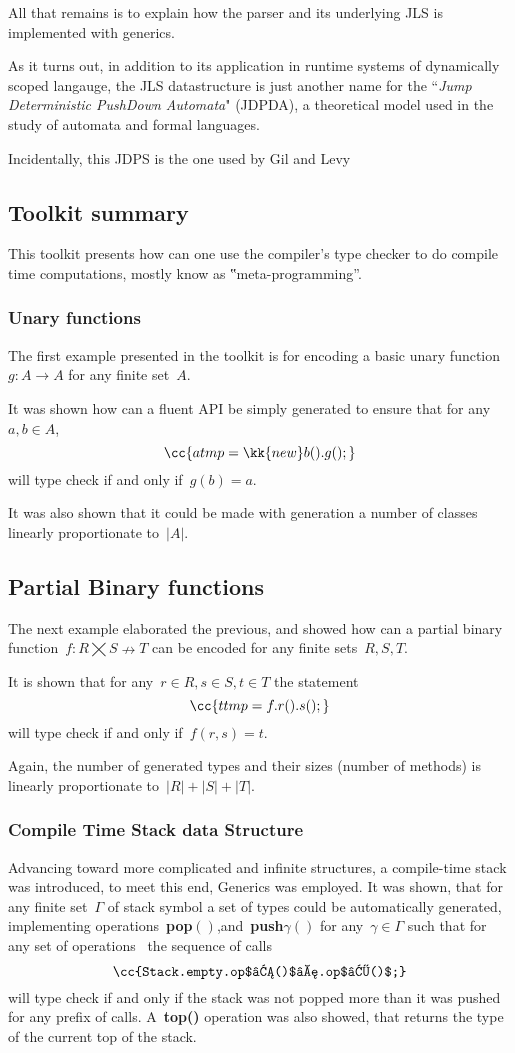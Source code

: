 All that remains is to explain how the \RLLp parser and its 
  underlying JLS is implemented with \Java generics. 

As it turns out, in addition to its application in runtime systems of
dynamically scoped langauge, the JLS datastructure is just another
name for the ``\emph{Jump Deterministic PushDown Automata}" (JDPDA), 
a theoretical model used in the study of automata and formal languages.
  
Incidentally, this JDPS is the one used by Gil and Levy~\cite{Gil:Levy}




\subsection{Toolkit summary}
This toolkit presents how can one use the \Java compiler's
type checker to do compile time computations, mostly know as
‟meta-programming”.

\subsubsection*{Unary functions}
The first example presented in the toolkit is for encoding a
basic unary function~$g:A→A$ for any finite set~$A$.

It was shown how can a fluent API be simply generated
to ensure that for any~$a,b∈A$,
\[
  \cc{a tmp = \kk{new} b().g();}
\]
will type check if and only if~$g(b)=a$.

It was also shown that it could be made with generation
a number of classes linearly proportionate to~$|A|$.

\subsection*{Partial Binary functions}
The next example elaborated the previous, and showed
how can a partial binary function~$f:R⨉S↛T$
can be encoded for any finite sets~$R,S,T$.

It is shown that for any~$r∈R, s∈S, t∈T$
the statement
\[
  \cc{t tmp = f.r().s();}
\]
will type check if and only if~$f(r,s)=t$.

Again, the number of generated types and their sizes (number of methods)
is linearly proportionate to~$|R|+|S|+|T|$.

\subsubsection*{Compile Time Stack data Structure}
Advancing toward more complicated and infinite structures,
a compile-time stack was introduced, to meet this end,
\Java Generics was employed.
It was shown, that for any finite set~$Γ$ of stack symbol a set of \Java types
could be automatically generated, implementing
operations~\textbf{pop$()$},and~\textbf{push$γ()$} for any~$γ∈Γ$ such that for
any set of operations~ the sequence of calls\[
\cc{Stack.empty.op$₁()$….op$ₖ()$;} \] will type check if and only if the stack
was not popped more than it was pushed for any prefix of calls.  A~\textbf{top()}
operation was also showed, that returns the type of the current top of the
stack.

